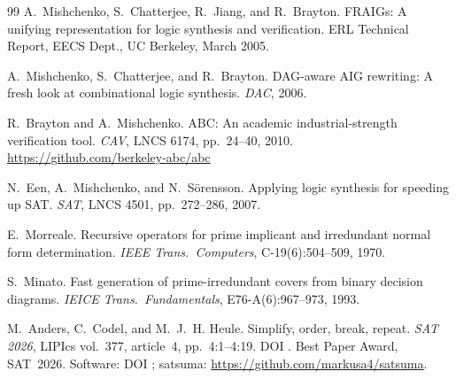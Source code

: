 \documentclass[10pt]{article}
\begin{document}
\begin{thebibliography}{99}
 A.~Mishchenko, S.~Chatterjee, R.~Jiang, and R.~Brayton.
\newblock FRAIGs: A unifying representation for logic synthesis and
  verification.
\newblock ERL Technical Report, EECS Dept., UC Berkeley, March 2005.

 A.~Mishchenko, S.~Chatterjee, and R.~Brayton.
\newblock DAG-aware AIG rewriting: A fresh look at combinational logic
  synthesis.
\newblock \emph{DAC}, 2006.

 R.~Brayton and A.~Mishchenko.
\newblock ABC: An academic industrial-strength verification tool.
\newblock \emph{CAV}, LNCS 6174, pp.~24--40, 2010.
\newblock \url{https://github.com/berkeley-abc/abc}

 N.~Een, A.~Mishchenko, and N.~S\"orensson.
\newblock Applying logic synthesis for speeding up SAT.
\newblock \emph{SAT}, LNCS 4501, pp.~272--286, 2007.

 E.~Morreale.
\newblock Recursive operators for prime implicant and irredundant normal
  form determination.
\newblock \emph{IEEE Trans.\ Computers}, C-19(6):504--509, 1970.

 S.~Minato.
\newblock Fast generation of prime-irredundant covers from binary
  decision diagrams.
\newblock \emph{IEICE Trans.\ Fundamentals}, E76-A(6):967--973, 1993.

 M.~Anders, C.~Codel, and M.~J.~H. Heule.
\newblock Simplify, order, break, repeat.
\newblock \emph{SAT 2026}, LIPIcs vol.~377, article~4, pp.~4:1--4:19.
\newblock DOI . Best Paper Award,
  SAT~2026. Software: DOI ; satsuma:
  \url{https://github.com/markusa4/satsuma}.

\end{thebibliography}
\end{document}
